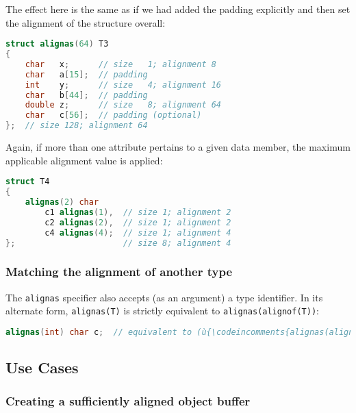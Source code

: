 \noindent The effect here is the same as if we had added the padding explicitly
and then set the alignment of the structure overall:

\begin{lstlisting}[language=C++]
struct alignas(64) T3
{
    char   x;      // size   1; alignment 8
    char   a[15];  // padding
    int    y;      // size   4; alignment 16
    char   b[44];  // padding
    double z;      // size   8; alignment 64
    char   c[56];  // padding (optional)
};  // size 128; alignment 64
\end{lstlisting}

\noindent Again, if more than one attribute pertains to a given data member,
the maximum applicable alignment value is applied:

\begin{lstlisting}[language=C++]
struct T4
{
    alignas(2) char
        c1 alignas(1),  // size 1; alignment 2
        c2 alignas(2),  // size 1; alignment 2
        c4 alignas(4);  // size 1; alignment 4
};                      // size 8; alignment 4
\end{lstlisting}


\subsubsection[Matching the alignment of another type]{Matching the alignment of another type}\label{matching-the-alignment-of-another-type}

The \texttt{alignas} specifier also accepts (as an argument) a type
identifier. In its alternate form, \texttt{alignas(T)} is strictly
equivalent to \texttt{alignas(alignof(T))}:

\begin{lstlisting}[language=C++]
alignas(int) char c;  // equivalent to (ù{\codeincomments{alignas(alignof(int)) char c;}}ù)
\end{lstlisting}


\subsection[Use Cases]{Use Cases}\label{alignas-use-cases}

\subsubsection[Creating a sufficiently aligned object buffer]{Creating a sufficiently aligned object buffer}\label{creating-a-sufficiently-aligned-object-buffer}

